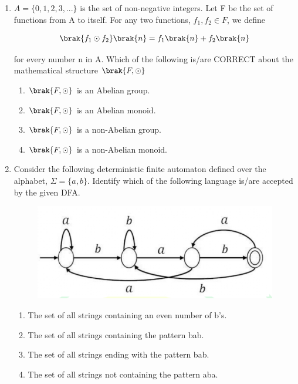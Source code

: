 \documentclass[a4paper, 11pt]{article}
\begin{document}
\begin{enumerate}
    \hfill{}

    \item $A = \{0,1,2,3,...\}$ is the set of non-negative integers. Let F be the set of functions from A to itself. For any two functions, $f_1, f_2 \in F$, we define
    \begin{center}
        \[ \brak{f_1 \odot f_2}\brak{n} = f_1\brak{n} + f_2\brak{n} \]
    \end{center}
    for every number n in A. Which of the following is/are CORRECT about the mathematical structure $\brak{F, \odot}$
    \begin{enumerate}
        \item $\brak{F, \odot}$ is an Abelian group.
        \item $\brak{F, \odot}$ is an Abelian monoid.
        \item $\brak{F, \odot}$ is a non-Abelian group.
        \item $\brak{F, \odot}$ is a non-Abelian monoid.
    \end{enumerate}

    \hfill{}

    \item Consider the following deterministic finite automaton  defined over the alphabet, $\Sigma = \{a,b\}$. Identify which of the following language is/are accepted by the given DFA.
    
    \begin{figure}[H]
        \centering
        \includegraphics[width=0.6\columnwidth]{figs/q50.png}
        \caption*{}
        \label{fig:q50}
    \end{figure}
    
    \begin{enumerate}
        \item The set of all strings containing an even number of b's.
        \item The set of all strings containing the pattern bab.
        \item The set of all strings ending with the pattern bab.
        \item The set of all strings not containing the pattern aba.
    \end{enumerate}


\end{enumerate}
\end{document}
